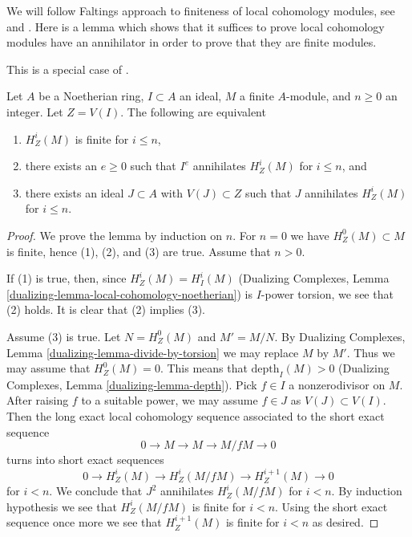 \noindent
We will follow Faltings approach to finiteness of local cohomology
modules, see \cite{Faltings-annulators} and \cite{Faltings-finiteness}.
Here is a lemma which shows that it suffices to prove
local cohomology modules have an annihilator in order to prove that
they are finite modules.

\begin{lemma}
\label{lemma-check-finiteness-local-cohomology-by-annihilator}
\begin{reference}
This is a special case of \cite[Lemma 3]{Faltings-annulators}.
\end{reference}
Let $A$ be a Noetherian ring, $I \subset A$ an ideal, $M$ a finite
$A$-module, and $n \geq 0$ an integer. Let $Z = V(I)$.
The following are equivalent
\begin{enumerate}
\item $H^i_Z(M)$ is finite for $i \leq n$,
\item there exists an $e \geq 0$ such that $I^e$ annihilates
$H^i_Z(M)$ for $i \leq n$, and
\item there exists an ideal $J \subset A$ with $V(J) \subset Z$
such that $J$ annihilates $H^i_Z(M)$ for $i \leq n$.
\end{enumerate}
\end{lemma}

\begin{proof}
We prove the lemma by induction on $n$. For $n = 0$ we have
$H^0_Z(M) \subset M$ is finite, hence (1), (2), and (3) are true.
Assume that $n > 0$.

\medskip\noindent
If (1) is true, then, since $H^i_Z(M) = H^i_I(M)$
(Dualizing Complexes, Lemma \ref{dualizing-lemma-local-cohomology-noetherian})
is $I$-power torsion, we see that (2) holds.
It is clear that (2) implies (3).

\medskip\noindent
Assume (3) is true. Let $N = H^0_Z(M)$ and $M' = M/N$.
By Dualizing Complexes, Lemma \ref{dualizing-lemma-divide-by-torsion}
we may replace $M$ by $M'$.
Thus we may assume that $H^0_Z(M) = 0$.
This means that $\text{depth}_I(M) > 0$
(Dualizing Complexes, Lemma \ref{dualizing-lemma-depth}).
Pick $f \in I$ a nonzerodivisor on $M$. After raising $f$ to a suitable
power, we may assume $f \in J$ as $V(J) \subset V(I)$. Then the
long exact local cohomology sequence associated to the short
exact sequence
$$
0 \to M \to M \to M/fM \to 0
$$
turns into short exact sequences
$$
0 \to H^i_Z(M) \to H^i_Z(M/fM) \to H^{i + 1}_Z(M) \to 0
$$
for $i < n$. We conclude that $J^2$ annihilates $H^i_Z(M/fM)$
for $i < n$. By induction hypothesis we see that $H^i_Z(M/fM)$
is finite for $i < n$. Using the short exact sequence once more
we see that $H^{i + 1}_Z(M)$ is finite for $i < n$ as desired.
\end{proof}

